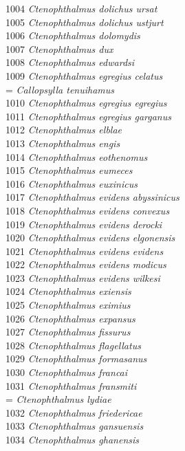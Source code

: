 \documentclass[
]{article}
\begin{document}
1004 \emph{Ctenophthalmus dolichus ursat}\\
1005 \emph{Ctenophthalmus dolichus ustjurt}\\
1006 \emph{Ctenophthalmus dolomydis}\\
1007 \emph{Ctenophthalmus dux}\\
1008 \emph{Ctenophthalmus edwardsi}\\
1009 \emph{Ctenophthalmus egregius celatus}\\
= \emph{Callopsylla tenuihamus}\\
1010 \emph{Ctenophthalmus egregius egregius}\\
1011 \emph{Ctenophthalmus egregius garganus}\\
1012 \emph{Ctenophthalmus elblae}\\
1013 \emph{Ctenophthalmus engis}\\
1014 \emph{Ctenophthalmus eothenomus}\\
1015 \emph{Ctenophthalmus eumeces}\\
1016 \emph{Ctenophthalmus euxinicus}\\
1017 \emph{Ctenophthalmus evidens abyssinicus}\\
1018 \emph{Ctenophthalmus evidens convexus}\\
1019 \emph{Ctenophthalmus evidens derocki}\\
1020 \emph{Ctenophthalmus evidens elgonensis}\\
1021 \emph{Ctenophthalmus evidens evidens}\\
1022 \emph{Ctenophthalmus evidens modicus}\\
1023 \emph{Ctenophthalmus evidens wilkesi}\\
1024 \emph{Ctenophthalmus exiensis}\\
1025 \emph{Ctenophthalmus eximius}\\
1026 \emph{Ctenophthalmus expansus}\\
1027 \emph{Ctenophthalmus fissurus}\\
1028 \emph{Ctenophthalmus flagellatus}\\
1029 \emph{Ctenophthalmus formasanus}\\
1030 \emph{Ctenophthalmus francai}\\
1031 \emph{Ctenophthalmus fransmiti}\\
= \emph{Ctenophthalmus lydiae}\\
1032 \emph{Ctenophthalmus friedericae}\\
1033 \emph{Ctenophthalmus gansuensis}\\
1034 \emph{Ctenophthalmus ghanensis}\\
\end{document}

